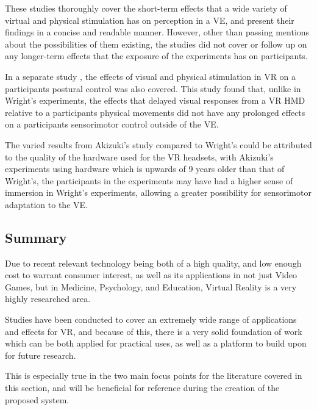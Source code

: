 		These studies thoroughly cover the short-term effects that a wide variety of virtual and physical stimulation has on perception in a VE, and present their findings in a concise and readable manner.
		However, other than passing mentions about the possibilities of them existing, the studies did not cover or follow up on any longer-term effects that the exposure of the experiments has on participants.

		In a separate study \cite{Akizuki2005}, the effects of visual and physical stimulation in VR on a participants postural control was also covered.
		This study found that, unlike in Wright's experiments, the effects that delayed visual responses from a VR HMD relative to a participants physical movements did not have any prolonged effects on a participants sensorimotor control outside of the VE.

		The varied results from Akizuki's study compared to Wright's could be attributed to the quality of the hardware used for the VR headsets, with Akizuki's experiments using hardware which is upwards of 9 years older than that of Wright's, the participants in the experiments may have had a higher sense of immersion in Wright's experiments, allowing a greater possibility for sensorimotor adaptation to the VE.

	\subsection{Summary}
	\label{lr:vr:conclusion}
		Due to recent relevant technology being both of a high quality, and low enough cost to warrant consumer interest, as well as its applications in not just Video Games, but in Medicine, Psychology, and Education, Virtual Reality is a very highly researched area.

		Studies have been conducted to cover an extremely wide range of applications and effects for VR, and because of this, there is a very solid foundation of work which can be both applied for practical uses, as well as a platform to build upon for future research.

		This is especially true in the two main focus points for the literature covered in this section, and will be beneficial for reference during the creation of the proposed system.
